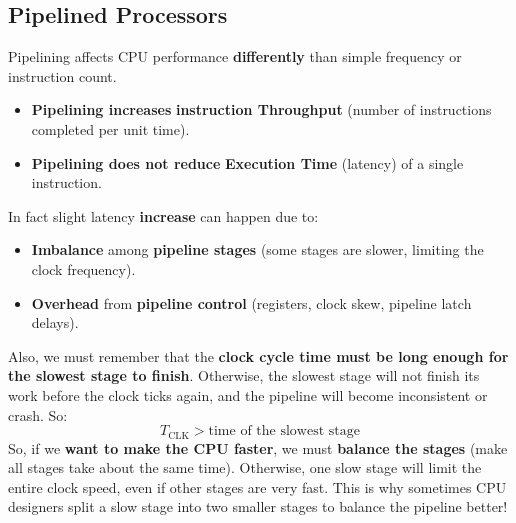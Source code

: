 \subsection{Pipelined Processors}

Pipelining affects CPU performance \textbf{differently} than simple frequency or instruction count.
\begin{itemize}
    \item[\textcolor{Green3}{\faIcon{check}}] \textcolor{Green3}{\textbf{Pipelining increases}} \textbf{instruction Throughput} (number of instructions completed per unit time).
    \item[\textcolor{Red2}{\faIcon{times}}] \textcolor{Red2}{\textbf{Pipelining does not reduce}} \textbf{Execution Time} (latency) of a single instruction.
\end{itemize}
In fact slight latency \textbf{increase} can happen due to:
\begin{itemize}
    \item \textbf{Imbalance} among \textbf{pipeline stages} (some stages are slower, limiting the clock frequency).
    \item \textbf{Overhead} from \textbf{pipeline control} (registers, clock skew, pipeline latch delays).
\end{itemize}
Also, we must remember that the \textbf{clock cycle time must be long enough for the slowest stage to finish}. Otherwise, the slowest stage will not finish its work before the clock ticks again, and the pipeline will become inconsistent or crash. So:
\begin{equation*}
    T_{\text{CLK}} > \text{time of the slowest stage}
\end{equation*}
So, if we \textbf{want to make the CPU faster}, we must \textbf{balance the stages} (make all stages take about the same time). Otherwise, one slow stage will limit the entire clock speed, even if other stages are very fast. This is why sometimes CPU designers split a slow stage into two smaller stages to balance the pipeline better!


